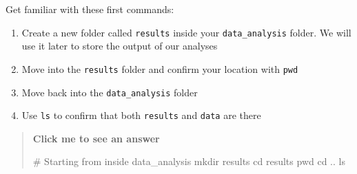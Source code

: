 \documentclass[
  letterpaper,
  DIV=11,
  numbers=noendperiod]{scrreprt}
\newenvironment{Shaded}{}{}
\newcommand{\BuiltInTok}[1]{\textcolor[rgb]{0.84,0.23,0.29}{#1}}
\newcommand{\CommentTok}[1]{\textcolor[rgb]{0.42,0.45,0.49}{#1}}
\newcommand{\FunctionTok}[1]{\textcolor[rgb]{0.44,0.26,0.76}{#1}}
\newcommand{\NormalTok}[1]{\textcolor[rgb]{0.14,0.16,0.18}{#1}}
\providecommand{\tightlist}{%
  \setlength{\itemsep}{0pt}\setlength{\parskip}{0pt}}
\begin{document}
\begin{tcolorbox}[enhanced jigsaw, coltitle=black, breakable, titlerule=0mm, colback=white, rightrule=.15mm, bottomrule=.15mm, toprule=.15mm, colframe=quarto-callout-color-frame, colbacktitle=quarto-callout-color!10!white, bottomtitle=1mm, opacitybacktitle=0.6, toptitle=1mm, leftrule=.75mm, arc=.35mm, title=\textcolor{quarto-callout-color}{\faInfo}\hspace{0.5em}{Exercise}, left=2mm, opacityback=0]

Get familiar with these first commands:

\begin{enumerate}
\def\labelenumi{\arabic{enumi}.}
\tightlist
\item
  Create a new folder called \texttt{results} inside your
  \texttt{data\_analysis} folder. We will use it later to store the
  output of our analyses
\item
  Move into the \texttt{results} folder and confirm your location with
  \texttt{pwd}
\item
  Move back into the \texttt{data\_analysis} folder
\item
  Use \texttt{ls} to confirm that both \texttt{results} and
  \texttt{data} are there
\end{enumerate}

\begin{quote}
\textbf{Click me to see an answer}

\begin{Shaded}
\begin{Highlighting}[]
\CommentTok{\# Starting from inside data\_analysis}
\FunctionTok{mkdir}\NormalTok{ results}
\BuiltInTok{cd}\NormalTok{ results}
\BuiltInTok{pwd}
\BuiltInTok{cd}\NormalTok{ ..}
\FunctionTok{ls}
\end{Highlighting}
\end{Shaded}
\end{quote}

\end{tcolorbox}
\end{document}
